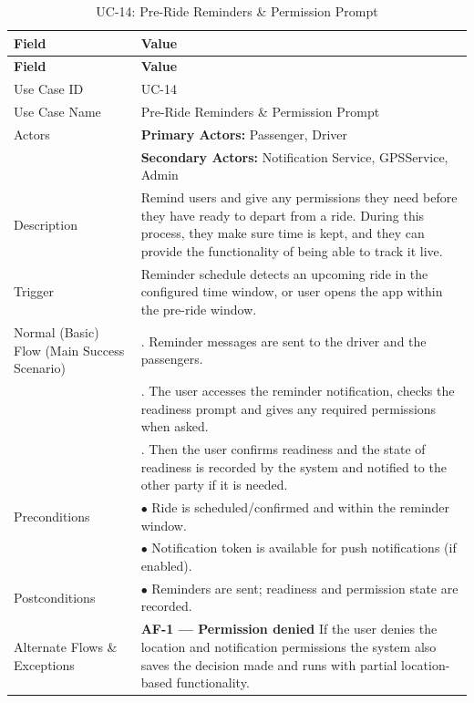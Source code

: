 \begin{longtable}{|>{\raggedright\arraybackslash}p{4cm}|>{\raggedright\arraybackslash}p{11cm}|}
\caption{UC-14: Pre-Ride Reminders \& Permission Prompt}
\label{tab:uc-14} \\
\hline
\rowcolor{lightgray!30}
\textbf{Field} & \textbf{Value} \\
\hline
\endfirsthead
\hline
\rowcolor{lightgray!30}
\textbf{Field} & \textbf{Value} \\
\hline
\endhead
\hline
\endfoot
\hline
\endlastfoot
Use Case ID & UC-14 \\
\hline
Use Case Name & Pre-Ride Reminders \& Permission Prompt \\
\hline
Actors & \textbf{Primary Actors:} Passenger, Driver \\
& \textbf{Secondary Actors:} Notification Service, GPSService, Admin \\
\hline
Description & Remind users and give any permissions they need before they have ready to depart from a ride. During this process, they make sure time is kept, and they can provide the functionality of being able to track it live. \\
\hline
Trigger & Reminder schedule detects an upcoming ride in the configured time window, or user opens the app within the pre-ride window. \\
\hline
Normal (Basic) Flow (Main Success Scenario) & 1. Reminder messages are sent to the driver and the passengers. \\
& 2. The user accesses the reminder notification, checks the readiness prompt and gives any required permissions when asked. \\
& 3. Then the user confirms readiness and the state of readiness is recorded by the system and notified to the other party if it is needed. \\
\hline
Preconditions & $\bullet$ Ride is scheduled/confirmed and within the reminder window. \\
& $\bullet$ Notification token is available for push notifications (if enabled). \\
\hline
Postconditions & $\bullet$ Reminders are sent; readiness and permission state are recorded. \\
\hline
Alternate Flows \& Exceptions & \textbf{AF-1 — Permission denied} \newline If the user denies the location and notification permissions the system also saves the decision made and runs with partial location-based functionality. \\

\end{longtable}
